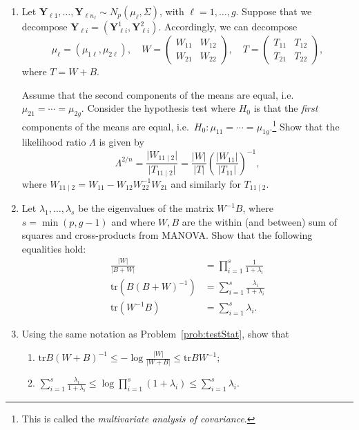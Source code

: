 \documentclass[12pt]{paper}
\numberwithin{equation}{section} %
\numberwithin{figure}{section} %
\numberwithin{table}{section} %
\begin{document}
\begin{enumerate}
	\vspace{1.5cm}\item Let $\mathbf{Y}_{\ell 1}, \ldots, \mathbf{Y}_{\ell n_\ell} \sim N_p(\mu_\ell, \Sigma)$, with $\ell = 1, \ldots, g$. Suppose that we decompose $\mathbf{Y}_{\ell i} = (\mathbf{Y}_{\ell i}^1, \mathbf{Y}_{\ell i}^2)$. Accordingly, we can decompose
	$$\mu_\ell = (\mu_{1\ell}, \mu_{2\ell}), \quad W = \begin{pmatrix}
	W_{11} & W_{12}\\ W_{21} & W_{22}\end{pmatrix}, \quad T = \begin{pmatrix}
	T_{11} & T_{12}\\ T_{21} & T_{22}\end{pmatrix},$$  
	where $T = W + B$.
	
	Assume that the second components of the means are equal, i.e.\ $\mu_{21} = \cdots = \mu_{2g}$. Consider the hypothesis test where $H_0$ is that the \emph{first} components of the means are equal, i.e.\ $H_0: \mu_{11} = \cdots = \mu_{1g}$.\footnote{This is called the \emph{multivariate analysis of covariance}.} Show that the likelihood ratio $\Lambda$ is given by 
	$$ \Lambda^{2/n} = \frac{\lvert W_{11\mid 2}\rvert}{\lvert T_{11\mid 2}\rvert} = \frac{\lvert W \rvert}{\lvert T \rvert} \left(\frac{\lvert W_{11} \rvert}{\lvert T_{11} \rvert}\right)^{-1},$$ 
	where $W_{11\mid 2} = W_{11} - W_{12}W_{22}^{-1}W_{21}$ and similarly for $T_{11\mid 2}$.
	
	\vspace{1.5cm}\item\label{prob:testStat} Let $\lambda_1, \ldots, \lambda_s$ be the eigenvalues of the matrix $W^{-1}B$, where $s = \min(p, g-1)$ and where $W,B$ are the within (and between) sum of squares and cross-products from MANOVA. Show that the following equalities hold:
	\begin{align*}
	 \frac{\lvert W \rvert}{\lvert B + W \rvert} &= \prod_{i=1}^s\frac{1}{1 + \lambda_i} \\
	 \mathrm{tr}\left( B(B+W)^{-1}\right)&= \sum_{i=1}^s\frac{\lambda_i}{1 + \lambda_i} \\
	 \mathrm{tr}\left( W^{-1}B\right) &= \sum_{i=1}^s\lambda_i.
	\end{align*}
	
	\vspace{1.5cm}\item Using the same notation as Problem~\ref{prob:testStat}, show that
	\begin{enumerate}
		\item $\mathrm{tr} B (W + B)^{-1} \leq -\log \frac{\lvert W \rvert}{\lvert W + B \rvert} \leq \mathrm{tr} BW^{-1}$;
		\item $\sum_{i=1}^{s} \frac{\lambda_i}{1 + \lambda_i} \leq \log\prod_{i=1}^s (1 + \lambda_i)\leq \sum_{i=1}^s \lambda_i$.
	\end{enumerate}
	
\end{enumerate}
\end{document}
